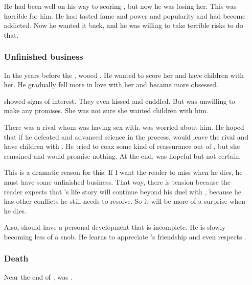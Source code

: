 He had been well on his way to scoring \Firaxel, but now he was losing her. 
This was horrible for him.
He had tasted fame and power and popularity and had become addicted.
Now he wanted it back, and he was willing to take terrible risks to do that.






\subsubsection{Unfinished business}
In the years before the \thirdbanewar, \Teshrial wooed . 
He wanted to score her and have children with her. 
He gradually fell more in love with her and became more obsessed. 

\Firaxel showed signs of interest. 
They even kissed and cuddled. 
But \Firaxel was unwilling to make any promises.
She was not sure she wanted children with him. 

There was a rival whom \Firaxel was having sex with.
\Teshrial was worried about him.
He hoped that if he defeated \Ishnaruchaefir and advanced science in the process, \Firaxel would leave the rival and have children with \Teshrial.
He tried to coax some kind of reassurance out of \Firaxel, but she remained \blase and would promise nothing.
At the end, \Teshrial was hopeful but not certain. 

This is a dramatic reason for this:
If I want the reader to miss \Teshrial when he dies, he must have some unfinished business.
That way, there is tension because the reader expects that \Teshrial's life story will continue beyond his duel with \Ishnaruchaefir, because he has other conflicts he still needs to resolve. 
So it will be more of a surprise when he dies. 

Also, \Teshrial should have a personal development that is incomplete. 
He is slowly becoming less of a snob.
He learns to appreciate \Urizeth's friendship and even respects \Achsah. 





\subsubsection{Death}
Near the end of \emph{\TwilightAngelRemember{}}, \Teshrial{} was .










